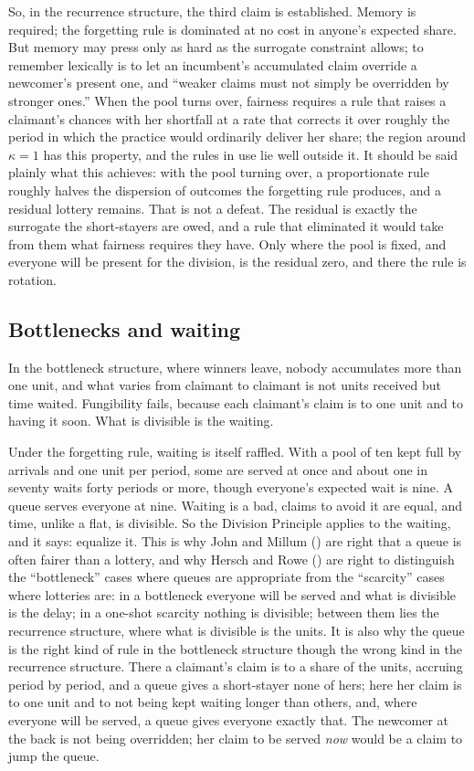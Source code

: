 \documentclass[
  11pt,
  letterpaper,
  DIV=11,
  numbers=noendperiod,
  twoside]{scrartcl}
\newcounter{none} %
\begin{document}
So, in the recurrence structure, the third claim is established. Memory
is required; the forgetting rule is dominated at no cost in anyone's
expected share. But memory may press only as hard as the surrogate
constraint allows; to remember lexically is to let an incumbent's
accumulated claim override a newcomer's present one, and ``weaker claims
must not simply be overridden by stronger ones.'' When the pool turns
over, fairness requires a rule that raises a claimant's chances with her
shortfall at a rate that corrects it over roughly the period in which
the practice would ordinarily deliver her share; the region around
\(\kappa = 1\) has this property, and the rules in use lie well outside
it. It should be said plainly what this achieves: with the pool turning
over, a proportionate rule roughly halves the dispersion of outcomes the
forgetting rule produces, and a residual lottery remains. That is not a
defeat. The residual is exactly the surrogate the short-stayers are
owed, and a rule that eliminated it would take from them what fairness
requires they have. Only where the pool is fixed, and everyone will be
present for the division, is the residual zero, and there the rule is
rotation.

\subsection{Bottlenecks and waiting}\label{sec-bottleneck}

In the bottleneck structure, where winners leave, nobody accumulates
more than one unit, and what varies from claimant to claimant is not
units received but time waited. Fungibility fails, because each
claimant's claim is to one unit and to having it soon. What is divisible
is the waiting.

Under the forgetting rule, waiting is itself raffled. With a pool of ten
kept full by arrivals and one unit per period, some are served at once
and about one in seventy waits forty periods or more, though everyone's
expected wait is nine. A queue serves everyone at nine. Waiting is a
bad, claims to avoid it are equal, and time, unlike a flat, is
divisible. So the Division Principle applies to the waiting, and it
says: equalize it. This is why John and Millum
() are right that a queue is often
fairer than a lottery, and why Hersch and Rowe
() are right to distinguish the
``bottleneck'' cases where queues are appropriate from the ``scarcity''
cases where lotteries are: in a bottleneck everyone will be served and
what is divisible is the delay; in a one-shot scarcity nothing is
divisible; between them lies the recurrence structure, where what is
divisible is the units. It is also why the queue is the right kind of
rule in the bottleneck structure though the wrong kind in the recurrence
structure. There a claimant's claim is to a share of the units, accruing
period by period, and a queue gives a short-stayer none of hers; here
her claim is to one unit and to not being kept waiting longer than
others, and, where everyone will be served, a queue gives everyone
exactly that. The newcomer at the back is not being overridden; her
claim to be served \emph{now} would be a claim to jump the queue.
\end{document}
